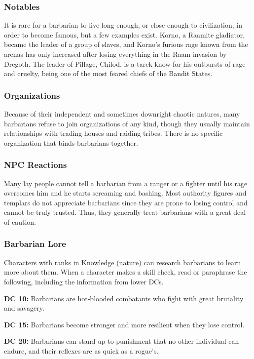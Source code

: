 \subsubsection{Notables}

It is rare for a barbarian to live long enough, or close enough to civilization, in order to become famous, but a few examples exist. Korno, a Raamite gladiator, became the leader of a group of slaves, and Korno's furious rage known from the arenas has only increased after losing everything in the Raam invasion by Dregoth. The leader of Pillage, Chilod, is a tarek know for his outbursts of rage and cruelty, being one of the most feared chiefs of the Bandit States.

\subsubsection{Organizations}

Because of their independent and sometimes downright chaotic natures, many barbarians refuse to join organizations of any kind, though they usually maintain relationships with trading houses and raiding tribes. There is no specific organization that binds barbarians together.

\subsubsection{NPC Reactions}

Many lay people cannot tell a barbarian from a ranger or a fighter until his rage overcomes him and he starts screaming and bashing. Most authority figures and templars do not appreciate barbarians since they are prone to losing control and cannot be truly trusted. Thus, they generally treat barbarians with a great deal of caution.

\subsubsection{Barbarian Lore}

Characters with ranks in Knowledge (nature) can research barbarians to learn more about them. When a character makes a skill check, read or paraphrase the following, including the information from lower DCs.

\textbf{DC 10:} Barbarians are hot‐blooded combatants who fight with great brutality and savagery.

\textbf{DC 15:} Barbarians become stronger and more resilient when they lose control.

\textbf{DC 20:} Barbarians can stand up to punishment that no other individual can endure, and their reflexes are as quick as a rogue's.
